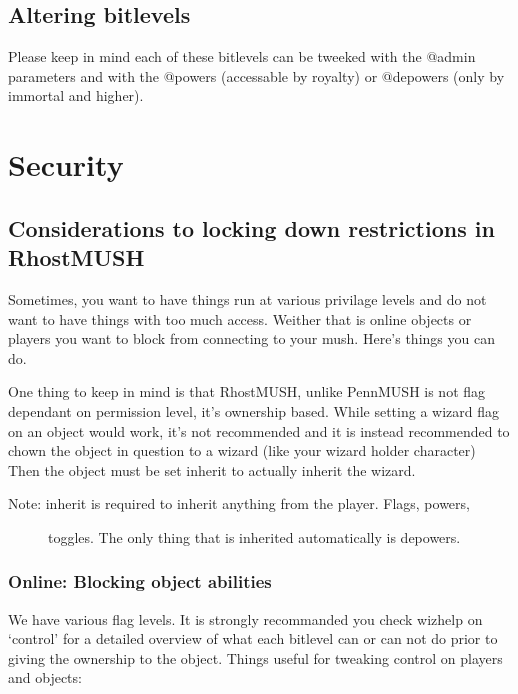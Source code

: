 \documentclass[letterpaper,10pt,english]{sphinxmanual}
\begin{document}
\subsection{Altering bitlevels}
\label{\detokenize{toggles:altering-bitlevels}}
\sphinxAtStartPar
Please keep in mind each of these bitlevels can be tweeked with the @admin
parameters and with the @powers (accessable by royalty) or @depowers (only
by immortal and higher).


\section{Security}
\label{\detokenize{security:security}}\label{\detokenize{security::doc}}

\subsection{Considerations to locking down restrictions in RhostMUSH}
\label{\detokenize{security:considerations-to-locking-down-restrictions-in-rhostmush}}
\sphinxAtStartPar
Sometimes, you want to have things run at various privilage levels and do not
want to have things with too much access.  Weither that is online objects or
players you want to block from connecting to your mush.  Here’s things you can
do.

\sphinxAtStartPar
One thing to keep in mind is that RhostMUSH, unlike PennMUSH is not flag
dependant on permission level, it’s ownership based.  While setting a wizard
flag on an object would work, it’s not recommended and it is instead recommended
to chown the object in question to a wizard (like your wizard holder character)
Then the object must be set inherit to actually inherit the wizard.
\begin{description}
\item[{Note: inherit is required to inherit anything from the player.  Flags, powers,}] \leavevmode
\sphinxAtStartPar
toggles.  The only thing that is inherited automatically is depowers.

\end{description}


\subsubsection{Online: Blocking object abilities}
\label{\detokenize{security:online-blocking-object-abilities}}
\sphinxAtStartPar
We have various flag levels.  It is strongly recommanded you check wizhelp
on ‘control’ for a detailed overview of what each bitlevel can or can not do
prior to giving the ownership to the object.  Things useful for tweaking control
on players and objects:
\end{document}
